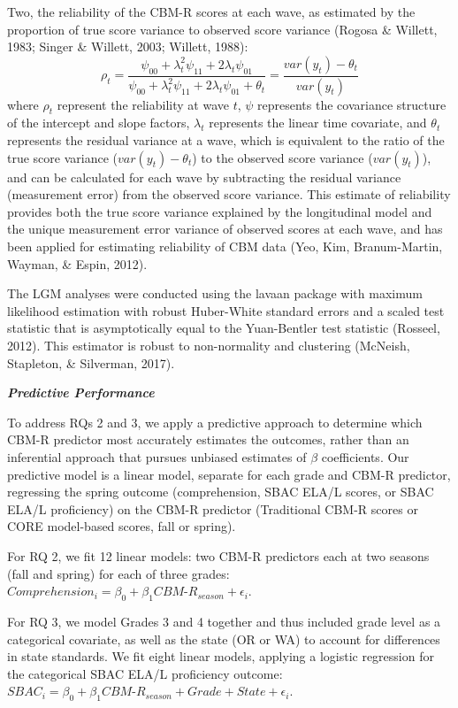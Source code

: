 \documentclass[
  english,
  man, fleqn, noextraspace]{apa6}
\begin{document}
Two, the reliability of the CBM-R scores at each wave, as estimated by the proportion of true score variance to observed score variance (Rogosa \& Willett, 1983; Singer \& Willett, 2003; Willett, 1988):
\[
\rho_t = \frac{\psi_{00} + \lambda^2_t \psi_{11} + 2\lambda_t \psi_{01}}{\psi_{00} + \lambda^2_t \psi_{11} + 2\lambda_t \psi_{01} + \theta_t} = \frac{var(y_t) - \theta_t}{var(y_t)}
\]
where \(\rho_t\) represent the reliability at wave \(t\), \(\psi\) represents the covariance structure of the intercept and slope factors, \(\lambda_t\) represents the linear time covariate, and \(\theta_t\) represents the residual variance at a wave, which is equivalent to the ratio of the true score variance (\(var(y_t) - \theta_t\)) to the observed score variance (\(var(y_t)\)), and can be calculated for each wave by subtracting the residual variance (measurement error) from the observed score variance. This estimate of reliability provides both the true score variance explained by the longitudinal model and the unique measurement error variance of observed scores at each wave, and has been applied for estimating reliability of CBM data (Yeo, Kim, Branum-Martin, Wayman, \& Espin, 2012).

The LGM analyses were conducted using the lavaan package with maximum likelihood estimation with robust Huber-White standard errors and a scaled test statistic that is asymptotically equal to the Yuan-Bentler test statistic (Rosseel, 2012). This estimator is robust to non-normality and clustering (McNeish, Stapleton, \& Silverman, 2017).

\textbf{\emph{Predictive Performance}}

To address RQs 2 and 3, we apply a predictive approach to determine which CBM-R predictor most accurately estimates the outcomes, rather than an inferential approach that pursues unbiased estimates of \(\beta\) coefficients. Our predictive model is a linear model, separate for each grade and CBM-R predictor, regressing the spring outcome (comprehension, SBAC ELA/L scores, or SBAC ELA/L proficiency) on the CBM-R predictor (Traditional CBM-R scores or CORE model-based scores, fall or spring).

For RQ 2, we fit 12 linear models: two CBM-R predictors each at two seasons (fall and spring) for each of three grades: \(Comprehension_i = \beta_0 + \beta_1CBM\mbox{-}R_{season} + \epsilon_i\).

For RQ 3, we model Grades 3 and 4 together and thus included grade level as a categorical covariate, as well as the state (OR or WA) to account for differences in state standards. We fit eight linear models, applying a logistic regression for the categorical SBAC ELA/L proficiency outcome: \(SBAC_i = \beta_0 + \beta_1CBM\mbox{-}R_{season} + Grade + State + \epsilon_i\).
\end{document}
